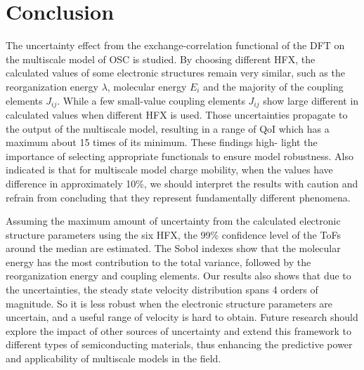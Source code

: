 \documentclass[%
 reprint,
superscriptaddress,
 amsmath,amssymb,
 aps,
prb,
floatfix
]{revtex4-2}
\begin{document}
\section{Conclusion}
The uncertainty effect from the exchange-correlation functional of the DFT on the multiscale model of OSC is studied. By choosing different HFX, the calculated values of some electronic structures remain very similar,
such as the reorganization energy $\lambda$, molecular energy $E_i$ and the majority of the coupling elements  $J_{ij}$. While a few small-value coupling elements $J_{ij}$ show large different in calculated values when different HFX is used. Those uncertainties propagate to the output of the multiscale model, resulting in a range of QoI which has a maximum about 15 times of its minimum. These findings high-
light the importance of selecting appropriate functionals to ensure model robustness. Also indicated is that for multiscale model charge mobility, when the values have difference in approximately 10\%, we should interpret the results with caution and refrain from concluding that they represent fundamentally different phenomena.

Assuming the maximum amount of uncertainty from the calculated electronic structure parameters using the six HFX, the 99\% confidence level of the ToFs around the median are estimated. The Sobol indexes show that the molecular energy has the most contribution to the total variance, followed by the reorganization energy and coupling elements. Our results also shows that due to the uncertainties, the steady state velocity distribution spans 4 orders of magnitude. So it is less robust when
the electronic structure parameters are uncertain, and a useful range of velocity is hard to obtain. Future research should explore the impact of other sources of uncertainty and extend this framework to different types of semiconducting materials, thus enhancing the predictive power and applicability of multiscale models in the field.




\appendix*
\end{document}
